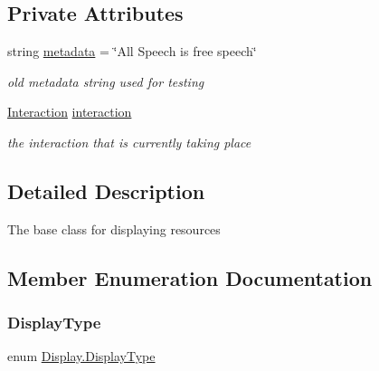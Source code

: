 \subsection*{Private Attributes}
\begin{DoxyCompactItemize}
\item 
string \mbox{\hyperlink{class_display_a76e9b246ebdd9a5799de8df52279f05e}{metadata}} = \char`\"{}All Speech is free speech\char`\"{}
\begin{DoxyCompactList}\small\item\em old metadata string used for testing \end{DoxyCompactList}\item 
\mbox{\hyperlink{class_interaction}{Interaction}} \mbox{\hyperlink{class_display_af35594f083ed6dd4279183215719583f}{interaction}}
\begin{DoxyCompactList}\small\item\em the interaction that is currently taking place \end{DoxyCompactList}\end{DoxyCompactItemize}


\subsection{Detailed Description}
The base class for displaying resources 



\subsection{Member Enumeration Documentation}
\mbox{\label{class_display_a7f7abc559192ef7e8f4a03382d3492d7}} 
\subsubsection{\texorpdfstring{Display\+Type}{DisplayType}}
{\footnotesize\ttfamily enum \mbox{\hyperlink{class_display_a7f7abc559192ef7e8f4a03382d3492d7}{Display.\+Display\+Type}}\hspace{0.3cm}{\ttfamily [strong]}}

